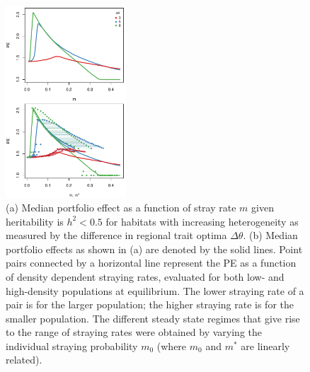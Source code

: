 \documentclass[twocolumn,preprintnumbers,amsmath,amssymb,superscriptaddress]{revtex4}
\begin{document}
\begin{figure}
  \captionsetup{justification=raggedright,
singlelinecheck=false
}
\centering
\includegraphics[width=0.4\textwidth]{figs2/fig_thetaPEmvm.pdf}
\caption{
(a) Median portfolio effect as a function of stray rate $m$ given heritability is $h^2 < 0.5$ for habitats with increasing heterogeneity as measured by the difference in regional trait optima $\Delta \theta$.
(b) Median portfolio effects as shown in (a) are denoted by the solid lines. 
Point pairs connected by a horizontal line represent the PE as a function of density dependent straying rates, evaluated for both low- and high-density populations at equilibrium. The lower straying rate of a pair is for the larger population; the higher straying rate is for the smaller population.
The different steady state regimes that give rise to the range of straying rates were obtained by varying the individual straying probability $m_0$ (where $m_0$ and $m^*$ are linearly related).
} \label{fig:thetaPE}
\end{figure}

\end{document}
